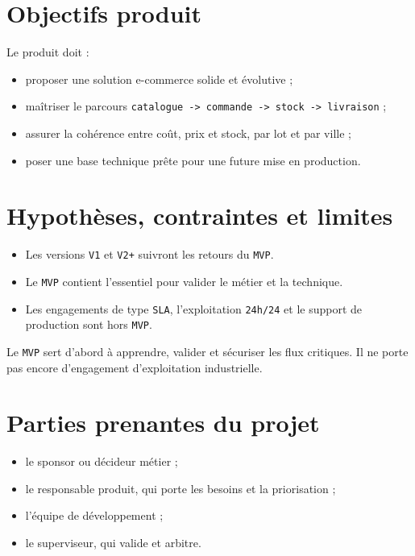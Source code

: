\documentclass[11pt,a4paper]{scrreprt}
\newcommand{\code}[1]{\texttt{#1}}
\begin{document}
\section{Objectifs produit}
Le produit doit :
\begin{itemize}
  \item proposer une solution e-commerce solide et évolutive ;
  \item maîtriser le parcours \code{catalogue -> commande -> stock -> livraison} ;
  \item assurer la cohérence entre coût, prix et stock, par lot et par ville ;
  \item poser une base technique prête pour une future mise en production.
\end{itemize}

\section{Hypothèses, contraintes et limites}
\begin{itemize}
  \item Les versions \code{V1} et \code{V2+} suivront les retours du \code{MVP}.
  \item Le \code{MVP} contient l'essentiel pour valider le métier et la technique.
  \item Les engagements de type \code{SLA}, l'exploitation \code{24h/24} et le support de production sont hors \code{MVP}.
\end{itemize}

Le \code{MVP} sert d'abord à apprendre, valider et sécuriser les flux critiques. Il ne porte pas encore d'engagement d'exploitation industrielle.

\section{Parties prenantes du projet}
\begin{itemize}
  \item le sponsor ou décideur métier ;
  \item le responsable produit, qui porte les besoins et la priorisation ;
  \item l'équipe de développement ;
  \item le superviseur, qui valide et arbitre.
\end{itemize}
\end{document}

